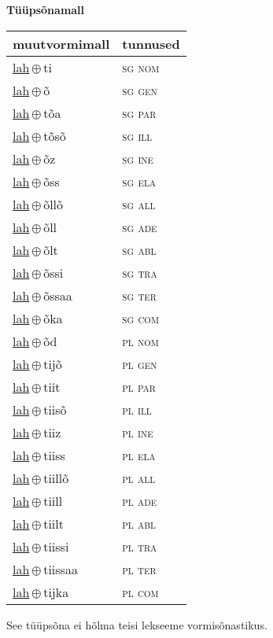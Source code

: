 

\vspace{3.5em}
\noindent \begin{minipage}{\textwidth}
\noindent \textbf{Tüüpsõnamall \,}\\

\begin{sideways}
\begin{tabular}{l l}
muutvormimall & tunnused \\
\hline
\underline{lah}\,$\oplus$\,ti & \textsc{ sg nom } \\
\underline{lah}\,$\oplus$\,õ & \textsc{ sg gen } \\
\underline{lah}\,$\oplus$\,tõa & \textsc{ sg par } \\
\underline{lah}\,$\oplus$\,tõsõ & \textsc{ sg ill } \\
\underline{lah}\,$\oplus$\,õz & \textsc{ sg ine } \\
\underline{lah}\,$\oplus$\,õss & \textsc{ sg ela } \\
\underline{lah}\,$\oplus$\,õllõ & \textsc{ sg all } \\
\underline{lah}\,$\oplus$\,õll & \textsc{ sg ade } \\
\underline{lah}\,$\oplus$\,õlt & \textsc{ sg abl } \\
\underline{lah}\,$\oplus$\,õssi & \textsc{ sg tra } \\
\underline{lah}\,$\oplus$\,õssaa & \textsc{ sg ter } \\
\underline{lah}\,$\oplus$\,õka & \textsc{ sg com } \\
\underline{lah}\,$\oplus$\,õd & \textsc{ pl nom } \\
\underline{lah}\,$\oplus$\,tijõ & \textsc{ pl gen } \\
\underline{lah}\,$\oplus$\,tiit & \textsc{ pl par } \\
\underline{lah}\,$\oplus$\,tiisõ & \textsc{ pl ill } \\
\underline{lah}\,$\oplus$\,tiiz & \textsc{ pl ine } \\
\underline{lah}\,$\oplus$\,tiiss & \textsc{ pl ela } \\
\underline{lah}\,$\oplus$\,tiillõ & \textsc{ pl all } \\
\underline{lah}\,$\oplus$\,tiill & \textsc{ pl ade } \\
\underline{lah}\,$\oplus$\,tiilt & \textsc{ pl abl } \\
\underline{lah}\,$\oplus$\,tiissi & \textsc{ pl tra } \\
\underline{lah}\,$\oplus$\,tiissaa & \textsc{ pl ter } \\
\underline{lah}\,$\oplus$\,tijka & \textsc{ pl com } \\
\end{tabular}
\end{sideways}
\label{tab:tüüpsõnamall-lahti}

\end{minipage}

 
\vspace{1em}
\noindent See tüüpsõna ei hõlma teisi lekseeme vormi\-sõnastikus.
